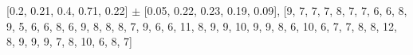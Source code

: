
[0.2, 0.21, 0.4, 0.71, 0.22] $\pm$ [0.05, 0.22, 0.23, 0.19, 0.09], [9, 7, 7, 7, 8, 7, 7, 6, 6, 8, 9, 5, 6, 6, 8, 6, 9, 8, 8, 8, 7, 9, 6, 6, 11, 8, 9, 9, 10, 9, 9, 8, 6, 10, 6, 7, 7, 8, 8, 12, 8, 9, 9, 9, 7, 8, 10, 6, 8, 7]\\
    